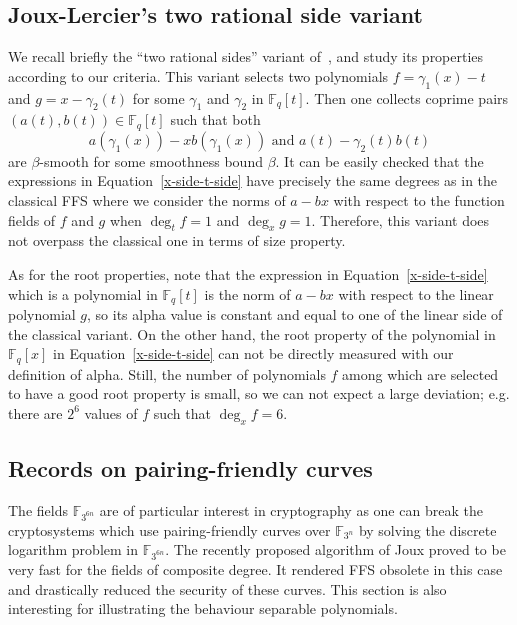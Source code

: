 \documentclass[a4wide]{article}
\newcommand{\F}{{\mathbb F}}
\theoremstyle{plain}
\theoremstyle{definition}
\theoremstyle{remark}
\begin{document}
\subsection{Joux-Lercier's two rational side variant}

We recall briefly the ``two rational sides'' variant of~\cite{JoLe06}, 
and study its properties according to our criteria. This variant selects two
polynomials $f=\gamma_1(x)-t$ and
$g=x-\gamma_2(t)$ for some $\gamma_1$ and $\gamma_2$ in $\F_q[t]$. Then
one collects coprime pairs $(a(t),b(t))\in\F_q[t]$ such that 
both 
\begin{equation}\label{x-side-t-side}
	a(\gamma_1(x))-xb(\gamma_1(x))\text{ and }a(t)-\gamma_2(t)b(t)
\end{equation}
 are $\beta$-smooth for some smoothness bound $\beta$. 
It can be easily checked that the expressions in Equation~\ref{x-side-t-side} have
precisely the same degrees as in the classical FFS where we consider the norms of
$a-bx$ with respect to the function fields of $f$ and $g$ when $\deg_tf=1$ and $\deg_xg=1$. 
Therefore, this variant does not overpass the classical one in terms of size property. 

As for the root properties, note that the expression in Equation~\ref{x-side-t-side} which is a
polynomial in $\F_q[t]$ is the norm of $a-bx$ with respect to the linear
polynomial $g$, so its alpha value is constant and equal to one of the linear
side of the classical variant. On the other hand, the root property of the polynomial in 
$\F_q[x]$ in Equation~\ref{x-side-t-side} can not be directly measured
with our definition of alpha. Still, 
the number of
polynomials $f$ among which are selected to have a good root property is
small, so we can not expect a large deviation; e.g. there are $2^6$ values of $f$ such
that $\deg_xf=6$.

\subsection{Records on pairing-friendly curves}
The fields $\F_{3^{6n}}$ are of particular interest in cryptography
as one can break the cryptosystems which use pairing-friendly curves over
$\F_{3^n}$ by solving the discrete logarithm problem in $\F_{3^{6n}}$. The
recently proposed algorithm of Joux \cite{Jo13} proved to be very fast for
the fields of composite degree. It rendered FFS obsolete in this case and
drastically reduced the security of these curves. This section is also
interesting for illustrating the behaviour separable polynomials.
\end{document}
